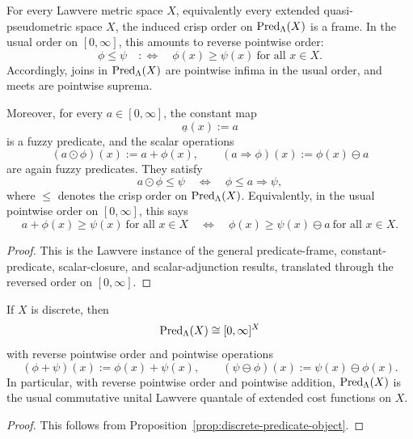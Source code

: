 \begin{proposition}
\label{prop:lawvere-predicate-algebra}
    For every Lawvere metric space \(X\), equivalently every extended quasi-pseudometric space \(X\), the induced crisp order on \(\mathrm{Pred}_\Lambda(X)\) is a frame. In the usual order on \([0,\infty]\), this amounts to reverse pointwise order:
    \[
        \phi\leq \psi
        \quad:\Longleftrightarrow\quad
        \phi(x)\geq \psi(x)
        \ \text{for all }x\in X.
    \]
    Accordingly, joins in \(\mathrm{Pred}_\Lambda(X)\) are pointwise infima in the usual order, and meets are pointwise suprema.

    Moreover, for every \(a\in [0,\infty]\), the constant map
    \[
        \underline{a}(x):=a
    \]
    is a fuzzy predicate, and the scalar operations
    \[
        (a\odot \phi)(x):=a+\phi(x),
        \qquad
        (a\Rightarrow \phi)(x):=\phi(x)\ominus a
    \]
    are again fuzzy predicates. They satisfy
    \[
        a\odot \phi\leq \psi
        \quad\Longleftrightarrow\quad
        \phi\leq a\Rightarrow \psi,
    \]
    where \(\leq\) denotes the crisp order on \(\mathrm{Pred}_\Lambda(X)\). Equivalently, in the usual pointwise order on \([0,\infty]\), this says
    \[
        a+\phi(x)\geq \psi(x)
        \ \text{for all }x\in X
        \quad\Longleftrightarrow\quad
        \phi(x)\geq \psi(x)\ominus a
        \ \text{for all }x\in X.
    \]
\end{proposition}

\begin{proof}
    This is the Lawvere instance of the general predicate-frame, constant-predicate, scalar-closure, and scalar-adjunction results, translated through the reversed order on \([0,\infty]\).
\end{proof}

\begin{corollary}
\label{cor:lawvere-discrete-predicate-algebra}
    If \(X\) is discrete, then
    \[
        \mathrm{Pred}_\Lambda(X)\cong [0,\infty]^X
    \]
    with reverse pointwise order and pointwise operations
    \[
        (\phi+\psi)(x):=\phi(x)+\psi(x),
        \qquad
        (\psi\ominus\phi)(x):=\psi(x)\ominus \phi(x).
    \]
    In particular, with reverse pointwise order and pointwise addition, \(\mathrm{Pred}_\Lambda(X)\) is the usual commutative unital Lawvere quantale of extended cost functions on \(X\).
\end{corollary}

\begin{proof}
    This follows from Proposition~\ref{prop:discrete-predicate-object}.
\end{proof}

